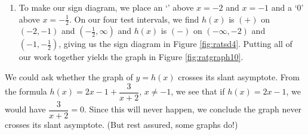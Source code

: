 {\begin{enumerate}
\begin{itemize}

\item  \textit{The behaviour of $y=h(x)$ as $x \rightarrow -\infty$:} Substituting  $x = \mbox{$-1$ billion}$ into $\dfrac{3}{x+2}$, we get the estimate $\frac{3}{\mbox{\scriptsize $-1$ billion}} \approx \mbox{very small $(-)$}$.  Hence, $h(x) = 2x-1+\dfrac{3}{x+2} \approx 2x-1 + \mbox{very small $(-)$}$.  This means the graph of $y=h(x)$ is a little bit \textit{below} the line $y=2x-1$ as $x \rightarrow -\infty$.

\item  \textit{The behaviour of $y=h(x)$ as $x \rightarrow \infty$:}  If $x \rightarrow \infty$, then $\dfrac{3}{x+2} \approx \mbox{very small $(+)$}$.  This means $h(x) \approx 2x-1 + \mbox{very small $(+)$}$, or that the graph of $y=h(x)$ is a little bit \textit{above} the line $y=2x-1$ as $x \rightarrow \infty$. The end behaviour is shown in Figure \ref{fig:ratgraph9}

\end{itemize}


\item  To make our sign diagram, we place an `\textinterrobang' above $x=-2$ and $x=-1$ and a `$0$' above $x=-\frac{1}{2}$.  On our four test intervals, we find $h(x)$ is $(+)$ on $(-2,-1)$ and $\left(-\frac{1}{2}, \infty\right)$ and $h(x)$ is $(-)$ on $(-\infty, -2)$ and $\left(-1,-\frac{1}{2}\right)$, giving us the sign diagram in Figure \ref{fig:ratsd4}.  Putting all of our work together yields the graph in Figure \ref{fig:ratgraph10}.

\end{enumerate}



We could ask whether the graph of $y=h(x)$ crosses its slant asymptote.  From the formula $h(x) = 2x-1+\dfrac{3}{x+2}$, $x \neq -1$, we see that if $h(x) = 2x-1$, we would have $\dfrac{3}{x+2} = 0$.  Since this will never happen, we conclude the graph never crosses its slant asymptote. (But rest assured, some graphs do!)
}

